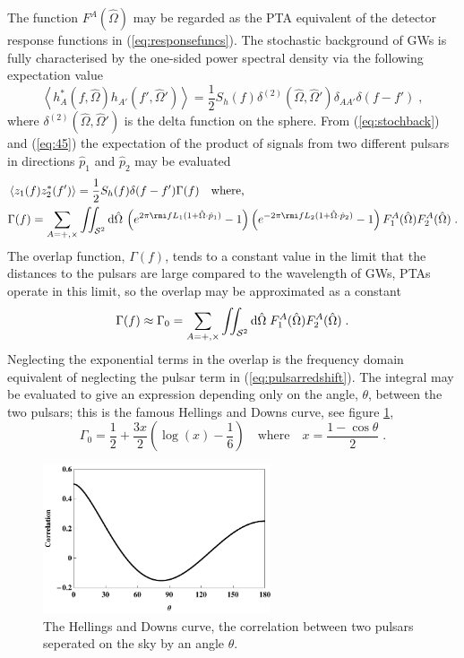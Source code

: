 The function $F^{A}(\hat{\Omega})$ may be regarded as the PTA equivalent of the detector response functions in (\ref{eq:responsefuncs}). The stochastic background of GWs is fully characterised by the one-sided power spectral density via the following expectation value
\begin{equation}\label{eq:stochback} \left<h_{A}^{*}(f,\hat{\Omega})h_{A'}(f',\hat{\Omega}')\right>=\frac{1}{2}S_{h}(f)\delta^{(2)}(\hat{\Omega},\hat{\Omega}')\delta_{AA'}\delta(f-f') \; ,\end{equation}
where $\delta^{(2)}(\hat{\Omega},\hat{\Omega}')$ is the delta function on the sphere. From (\ref{eq:stochback}) and (\ref{eq:45}) the expectation of the product of signals from two different pulsars in directions $\hat{p}_{1}$ and $\hat{p}_{2}$ may be evaluated
\begin{eqnarray} & \left<z_{1}(f)z_{2}^{*}(f')\right>=\frac{1}{2}S_{h}(f)\delta (f-f')\Gamma(f)\quad \textrm{where,} \\
& \Gamma(f)=\sum_{A=+,\times}\iint_{{\cal{S}}^{2}}\textrm{d}\hat{\Omega}\,\left(e^{2\pi\rmi fL_{1}(1+\hat{\Omega}\cdot\hat{p}_{1})}-1\right)\left(e^{-2\pi\rmi fL_{2}(1+\hat{\Omega}\cdot\hat{p}_{2})}-1\right)F_{1}^{A}(\hat{\Omega})F_{2}^{A}(\hat{\Omega}) \; . \nonumber\end{eqnarray}
The overlap function, $\Gamma(f)$, tends to a constant value in the limit that the distances to the pulsars are large compared to the wavelength of GWs, PTAs operate in this limit, so the overlap may be approximated as a constant 
\begin{equation} \Gamma(f)\approx\Gamma_{0}= \sum_{A=+,\times}\iint_{{\cal{S}}^{2}}\textrm{d}\hat{\Omega}\;F_{1}^{A}(\hat{\Omega})F_{2}^{A}(\hat{\Omega})\;.\end{equation}
Neglecting the exponential terms in the overlap is the frequency domain equivalent of neglecting the pulsar term in (\ref{eq:pulsarredshift}). The integral may be evaluated to give an expression depending only on the angle, $\theta$, between the two pulsars; this is the famous Hellings and Downs curve, see figure \ref{fig:HnD},
\begin{equation} \Gamma_{0}=\frac{1}{2}+\frac{3x}{2}\left(\log (x)-\frac{1}{6}\right) \quad \textrm{where}\quad x=\frac{1-\cos\theta}{2}\; .\end{equation}

\begin{figure}[h!]
 \centering
 \includegraphics[trim=0cm 0cm 0cm 0cm, width=0.6\textwidth]{HnDcurve.pdf}
 \caption{The Hellings and Downs curve, the correlation between two pulsars seperated on the sky by an angle $\theta$.}
 \label{fig:HnD}
\end{figure}


